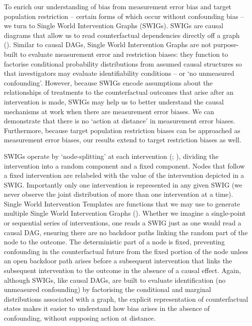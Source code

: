 \documentclass[
  single column]{article}
\begin{document}
To enrich our understanding of bias from measurement error bias and
target population restriction -- certain forms of which occur without
confounding bias -- we turn to Single World Intervention Graphs (SWIGs).
SWIGs are causal diagrams that allow us to read counterfactual
dependencies directly off a graph
(). Similar to
causal DAGs, Single World Intervention Graphs are not purpose-built to
evaluate measurement error and restriction biases: they function to
factorise conditional probability distributions from assumed causal
structures so that investigators may evaluate identifiability conditions
-- or `no unmeasured confounding'. However, because SWIGs encode
assumptions about the relationships of treatments to the counterfactual
outcomes that arise after an intervention is made, SWIGs may help us to
better understand the causal mechanisms at work when there are
measurement error biases. We can demonstrate that there is no `action at
distance' in measurement error biases. Furthermore, because target
population restriction biases can be approached as measurement error
biases, our results extend to target restriction biases as well.

SWIGs operate by `node-splitting' at each intervention
(;
), dividing
the intervention into a random component and a fixed component. Nodes
that follow a fixed intervention are relabeled with the value of the
intervention depicted in a SWIG. Importantly only one intervention is
represented in any given SWIG (we never observe the joint distribution
of more than one intervention at a time). Single World Intervention
Templates are functions that we may use to generate multiple Single
World Intervention Graphs
().
Whether we imagine a single-point or sequential series of interventions,
one reads a SWIG just as one would read a causal DAG, ensuring there are
no backdoor paths linking the random part of the node to the outcome.
The deterministic part of a node is fixed, preventing confounding in the
counterfactual future from the fixed portion of the node unless an open
backdoor path arises before a subsequent intervention that links the
subsequent intervention to the outcome in the absence of a causal
effect. Again, although SWIGs, like causal DAGs, are built to evaluate
identification (no unmeasured confounding) by factorising the
conditional and marginal distributions associated with a graph, the
explicit representation of counterfactual states makes it easier to
understand how bias arises in the absence of confounding, without
supposing action at distance.
\end{document}
